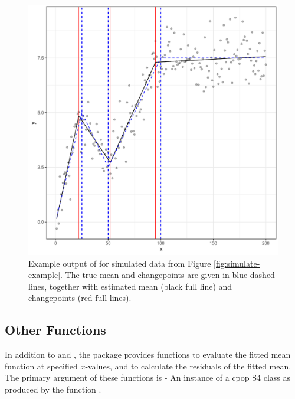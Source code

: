 \documentclass[nojss]{jss}
\begin{document}
\begin{figure}
\centering
\includegraphics[width=0.6\linewidth]{figures/cpop_example1_ggplot.pdf}
\caption{Example output of  for simulated data from Figure \ref{fig:simulate-example}. The true mean and changepoints are given in blue dashed lines, together with estimated mean (black full line) and changepoints (red full lines).   }
\label{fig:cpop-example}
\end{figure}
%
%
\subsection{Other Functions}
%
%
In addition to  and , the  package provides functions to evaluate the fitted mean function at specified $x$-values, and to calculate the residuals of the fitted mean. The primary argument of these functions is  - An instance of a cpop S4 class as produced by the function .
\end{document}

